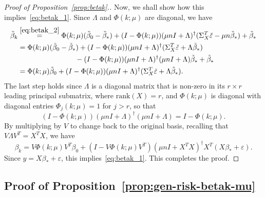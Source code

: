 \documentclass[11pt]{article}
\begin{document}
\begin{proof}[Proof of Proposition~\ref{prop:betak}.]
Now, we shall show how this implies~\eqref{eq:betak_1}.
Since $\Lambda$ and $\Phi(k; \mu)$ are diagonal, we have
\begin{align*}
    \tilde{\beta}_k
    &\overset{\eqref{eq:betak_2}}{=} \Phi(k; \mu)(\tilde{\beta}_0 - \tilde{\beta}_*) + (I - \Phi(k; \mu)) (\mu n I + \Lambda)^{\dagger} (\Sigma_X^T \check{\varepsilon} - \mu n \tilde{\beta}_*) +  \tilde{\beta}_*\\
    &= \Phi(k; \mu)(\tilde{\beta}_0 - \tilde{\beta}_*) + (I - \Phi(k; \mu)) (\mu n I + \Lambda)^{\dagger} (\Sigma_X^T \check{\varepsilon} + \Lambda \tilde{\beta}_*) \\
    &\quad\quad\quad\quad\quad\quad\quad\quad- (I - \Phi(k; \mu)) (\mu n I + \Lambda)^{\dagger} (\mu n I + \Lambda) \tilde{\beta}_* + \tilde{\beta}_* \\
    &= \Phi(k; \mu) \tilde{\beta}_0 + (I - \Phi(k; \mu)) (\mu n I + \Lambda)^{\dagger} (\Sigma_X^T \check{\varepsilon} + \Lambda \tilde{\beta}_*).
\end{align*}
The last step holds since $\Lambda$ is a diagonal matrix that is non-zero in its $r \times r$ leading principal submatrix, where $\mathrm{rank}(X) = r$, and $\Phi(k; \mu)$ is diagonal with diagonal entries $\Phi_j(k; \mu) = 1$ for $j > r$, so that
\[
    (I - \Phi(k; \mu)) (\mu n I + \Lambda)^{\dagger} (\mu n I + \Lambda) = I - \Phi(k; \mu).
\]
By multiplying by $V$ to change back to the original basis, recalling that $V \Lambda V^T = X^T X$, we have
\[
    \beta_k
    = V \Phi(k; \mu) V^T \beta_0 + (I - V \Phi(k; \mu) V^T) (\mu n I + X^T X)^{\dagger} X^T(X \beta_* + \varepsilon).
\]
Since $y = X\beta_* + \varepsilon$, this implies~\eqref{eq:betak_1}. This completes the proof.
\end{proof}

\subsection{Proof of Proposition~\ref{prop:gen-risk-betak-mu}}
\end{document}
